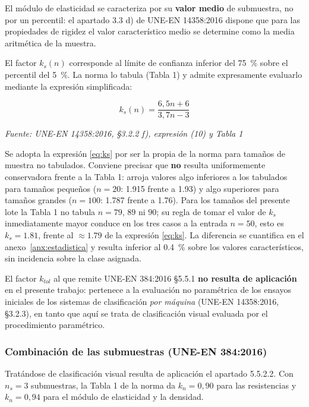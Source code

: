 \documentclass[11pt,a4paper]{article}
\newcommand{\fuente}[1]{{\small\textit{Fuente: #1}}}
\begin{document}
\noindent El módulo de elasticidad se caracteriza por su \textbf{valor medio} de
submuestra, no por un percentil: el apartado 3.3 d) de UNE-EN 14358:2016 dispone que
para las propiedades de rigidez el valor característico medio se determine como la
media aritmética de la muestra.

\medskip
\noindent El factor $k_{s}(n)$ corresponde al límite de confianza inferior del
\SI{75}{\percent} sobre el percentil del \SI{5}{\percent}. La norma lo tabula (Tabla 1)
y admite expresamente evaluarlo mediante la expresión simplificada:

\begin{equation}
k_{s}(n) = \frac{6{,}5n + 6}{3{,}7n - 3}
\tag{14358-10}\label{eq:ks}
\end{equation}

\fuente{UNE-EN 14358:2016, \S3.2.2 f), expresión (10) y Tabla 1}

\medskip
\noindent Se adopta la expresión \eqref{eq:ks} por ser la propia de la norma para
tamaños de muestra no tabulados. Conviene precisar que \textbf{no} resulta
uniformemente conservadora frente a la Tabla 1: arroja valores algo inferiores a los
tabulados para tamaños pequeños ($n = 20$: \num{1,915} frente a \num{1,93}) y algo
superiores para tamaños grandes ($n = 100$: \num{1,787} frente a \num{1,76}). Para los
tamaños del presente lote la Tabla 1 no tabula $n = 79$, $89$ ni $90$; su regla de
tomar el valor de $k_{s}$ inmediatamente mayor conduce en los tres casos a la entrada
$n = 50$, esto es $k_{s} = \num{1,81}$, frente al $\approx \num{1,79}$ de la expresión
\eqref{eq:ks}. La diferencia se cuantifica en el anexo~\ref{anx:estadistica} y resulta
inferior al \SI{0,4}{\percent} sobre los valores característicos, sin incidencia sobre
la clase asignada.

\medskip
\noindent El factor $k_{tol}$ al que remite UNE-EN 384:2016 \S5.5.1
\textbf{no resulta de aplicación} en el presente trabajo: pertenece a la evaluación no
paramétrica de los ensayos iniciales de los sistemas de clasificación \emph{por
máquina} (UNE-EN 14358:2016, \S3.2.3), en tanto que aquí se trata de clasificación
visual evaluada por el procedimiento paramétrico.

\subsubsection{Combinación de las submuestras (UNE-EN 384:2016)}

Tratándose de clasificación visual resulta de aplicación el apartado 5.5.2.2. Con
$n_{s} = 3$ submuestras, la Tabla 1 de la norma da $k_{n} = 0{,}90$ para las
resistencias y $k_{n} = 0{,}94$ para el módulo de elasticidad y la densidad.
\end{document}

